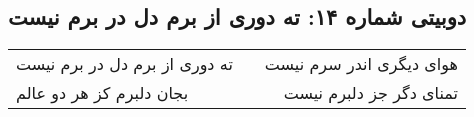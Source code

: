\begin{center}
\section*{دوبیتی شماره ۱۴: ته دوری از برم دل در برم نیست}
\label{sec:014}
\begin{longtable}{l p{0.5cm} r}
ته دوری از برم دل در برم نیست
&&
هوای دیگری اندر سرم نیست
\\
بجان دلبرم کز هر دو عالم
&&
تمنای دگر جز دلبرم نیست
\\
\end{longtable}
\end{center}
